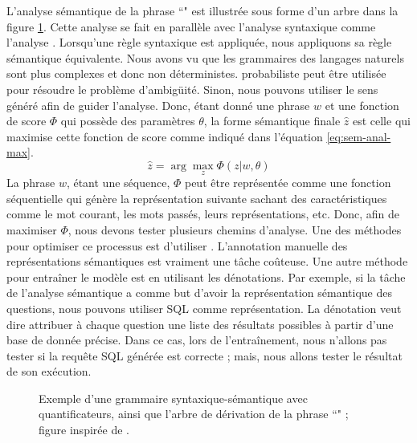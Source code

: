 \documentclass{KodeBook}
\begin{document}
L'analyse sémantique de la phrase ``" est illustrée sous forme d'un arbre dans la figure \ref{fig:regles-sem2}.
Cette analyse se fait en parallèle avec l'analyse syntaxique comme l'analyse . 
Lorsqu'une règle syntaxique est appliquée, nous appliquons sa règle sémantique équivalente.
Nous avons vu que les grammaires des langages naturels sont plus complexes et donc non déterministes. 
 probabiliste peut être utilisée pour résoudre le problème d'ambigüité.
Sinon, nous pouvons utiliser le sens généré afin de guider l'analyse. 
Donc, étant donné une phrase $w$ et une fonction de score $\Phi$ qui possède des paramètres $\theta$, la forme sémantique finale $\hat{z}$ est celle qui maximise cette fonction de score comme indiqué dans l'équation \ref{eq:sem-anal-max}.
\begin{equation}
\hat{z} = \arg\max_z \Phi(z|w, \theta)
\label{eq:sem-anal-max}
\end{equation}
La phrase $w$, étant une séquence, $\Phi$ peut être représentée comme une fonction séquentielle qui génère la représentation suivante sachant des caractéristiques comme le mot courant, les mots passés, leurs représentations, etc. 
Donc, afin de maximiser $\Phi$, nous devons tester plusieurs chemins d'analyse. 
Une des méthodes pour optimiser ce processus est d'utiliser . 
L'annotation manuelle des représentations sémantiques est vraiment une tâche coûteuse.
Une autre méthode pour entraîner le modèle est en utilisant les dénotations. 
Par exemple, si la tâche de l'analyse sémantique a comme but d'avoir la représentation sémantique des questions, nous pouvons utiliser SQL comme représentation. 
La dénotation veut dire attribuer à chaque question une liste des résultats possibles à partir d'une base de donnée précise. 
Dans ce cas, lors de l'entraînement, nous n'allons pas tester si la requête SQL générée est correcte ; mais, nous allons tester le résultat de son exécution. 

\begin{figure}[ht]
	\centering
	\caption[Exemple d'une grammaire syntaxique-sémantique avec quantificateurs.]{Exemple d'une grammaire syntaxique-sémantique avec quantificateurs, ainsi que l'arbre de dérivation de la phrase ``" ; figure inspirée de \cite{2018-eisenstein}.}
	\label{fig:regles-sem2}
\end{figure}
\end{document}
